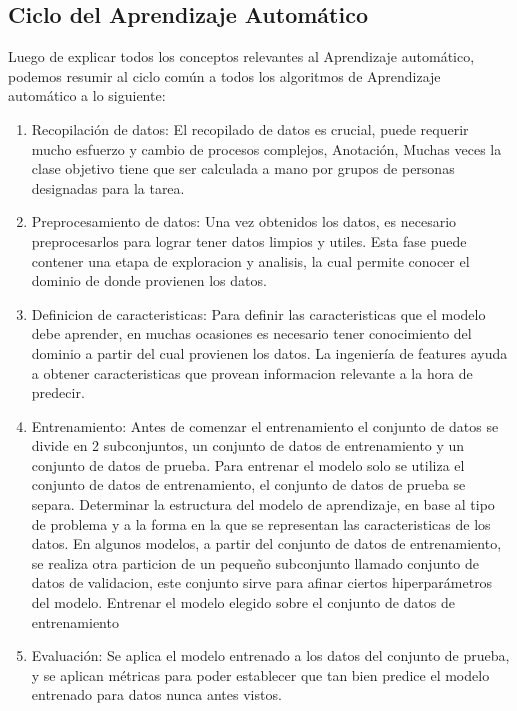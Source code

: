 \documentclass[a4paper,11pt,spanish]{book}
\begin{document}
    \subsection{Ciclo del Aprendizaje Automático}
      Luego de explicar todos los conceptos relevantes al Aprendizaje automático, podemos resumir al ciclo común a todos los algoritmos de Aprendizaje automático a lo siguiente:
      \begin{enumerate}
	\item Recopilación de datos:
	  El recopilado de datos es crucial, puede requerir mucho esfuerzo y cambio de procesos complejos,
	  Anotación, Muchas veces la clase objetivo tiene que ser calculada a mano por grupos de personas designadas para la tarea.
	\item Preprocesamiento de datos: Una vez obtenidos los datos, es necesario preprocesarlos para lograr tener datos limpios y utiles. Esta fase puede contener una etapa
	  de exploracion y analisis, la cual permite conocer el dominio de donde provienen los datos.
	\item Definicion de caracteristicas: Para definir las caracteristicas que el modelo debe aprender, en muchas ocasiones es necesario tener conocimiento del dominio a partir del cual provienen los datos.
	  La ingeniería de features ayuda a obtener caracteristicas que provean informacion relevante a la hora de predecir.
	\item Entrenamiento:
	  \subitem Antes de comenzar el entrenamiento el conjunto de datos se divide en 2 subconjuntos, un conjunto de datos de entrenamiento y un conjunto de datos de prueba.
	  \subitem Para entrenar el modelo solo se utiliza el conjunto de datos de entrenamiento, el conjunto de datos de prueba se separa.
	  \subitem Determinar la estructura del modelo de aprendizaje, en base al tipo de problema y a la forma en la que se representan las caracteristicas de los datos.
	  \subitem En algunos modelos, a partir del conjunto de datos de entrenamiento, se realiza otra particion de un pequeño subconjunto llamado conjunto de datos de validacion, este conjunto sirve
	  para afinar ciertos hiperparámetros del modelo.
	  \subitem Entrenar el modelo elegido sobre el conjunto de datos de entrenamiento
	\item Evaluación: Se aplica el modelo entrenado a los datos del conjunto de prueba, y se aplican métricas para poder establecer que tan bien predice el modelo entrenado para datos nunca antes vistos.
      \end{enumerate}
\end{document}
